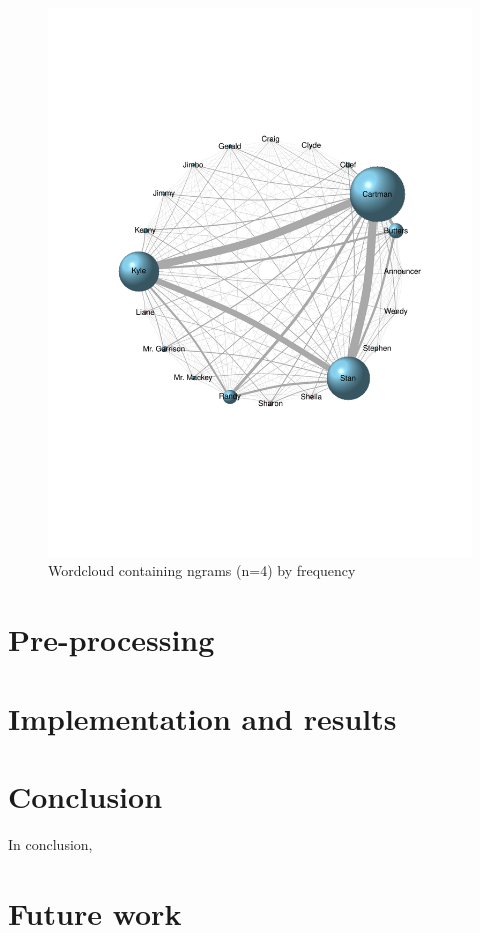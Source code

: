 \documentclass[10pt,a4paper]{article}
\begin{document}
	\begin{figure}[h]
	\centering
	\includegraphics[scale=0.7]{images/CoOccurence Matrix.pdf}
	\caption{Wordcloud containing ngrams (n=4) by frequency}
	\label{fig:CoOccurence}
	\end{figure}
	
	\section{Pre-processing}
	
	
	\section{Implementation and results}
	
	
	\section{Conclusion}
	In conclusion, 

	\section{Future work}
\end{document}
